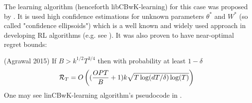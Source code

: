The learning algorithm (henceforth libCBwK-learning) for this case was proposed by \cite{Agrawal2015}. It is used high confidence estimations for unknown parameters $\theta^*$ and $W^*$ (so called "confidence ellipsoids") which is a well known and widely used approach in developing RL algorithms (e.g. see \cite{Auer2003}). It was also proven to have near-optimal regret bounds:

\begin{theorem} (Agrawal 2015) If $B > k^{1/2}T^{3/4}$ then with probability at least $1-\delta$ 
\[
    \operatorname{\mathcal{R}}_T = O\left((\frac{OPT}{B} + 1)k\sqrt{T\log(dT/\delta)\log(T)}\right)
\]  
    One may see linCBwK-learning algorithm's pseudocode in . 
    
\end{theorem}